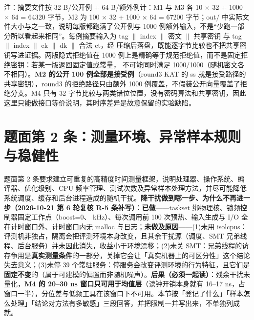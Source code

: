 \documentclass[UTF8,fontset=fandol,11pt,a4paper]{ctexart}
\begin{document}
\begin{landscape}
\begin{longtable}
\end{longtable}
\noindent 注：摘要文件按 32 B/公开例 + 64 B/额外例计：M1 与 M3 各 10 \texorpdfstring{$\times$}{x} 32 + 1000 \texorpdfstring{$\times$}{x} 64 = 64320 字节，M2 为 100 \texorpdfstring{$\times$}{x} 32 + 1000 \texorpdfstring{$\times$}{x} 64 = 67200 字节；out/ 中实际文件大小与之一致，说明每版都跑满了公开例与 1000 例额外输入，不是“少跑一部分所以看起来相同”。每例摘要输入为 tag \texorpdfstring{$\|$}{||} index \texorpdfstring{$\|$}{||} 密文 \texorpdfstring{$\|$}{||} 共享密钥 与 tag \texorpdfstring{$\|$}{||} index \texorpdfstring{$\|$}{||} ek \texorpdfstring{$\|$}{||} dk \texorpdfstring{$\|$}{||} 合法 ct，经 \texttt{} 压缩后落盘，既能逐字节比较也不把共享密钥写进证据。两版隐式拒绝值在 1000 例上是精确等于规范拒绝值，而不是固定拒绝密钥：若某一版返回固定值或常量，\texttt{} 不可能同时满足 1000/1000（随机密文各不相同）。\textbf{M2 的公开 100 例全部是接受例}（round3 KAT 的 ss 就是接受路径的共享密钥），round3 的拒绝路径只由额外 1000 例覆盖，不假装公开向量覆盖了拒绝分支。M4 只有 32 字节比较与两类错位位置，没有密码算法和共享密钥，因此这里只能做接口等价说明，其时序差异是故意保留的实验缺陷。\par\endgroup\vspace{3mm}\end{landscape}
\section{题面第 2 条：测量环境、异常样本规则与稳健性}
题面第 2 条要求建立可重复的高精度时间测量框架，说明处理器、操作系统、编译器、优化级别、CPU 频率管理、测试次数及异常样本处理方法，并尽可能降低系统调度、缓存和后台进程造成的随机干扰。\textbf{降干扰做到哪一步、为什么不再进一步（2026-10-21 第 6 轮复核 R-5 条补写）}：\textbf{已做}——taskset 绑物理核、锁频控制器固定工作点（boost=0、\texttt{} kHz）、每次调用前 100 次预热、输入生成与 I/O 全在计时窗口外、计时窗口内无 malloc 与日志；\textbf{未做及原因}——(1)未用 isolcpus：评测机非独占，隔离会把评测环境本身改变，且其余干扰源（调度、SMT 兄弟线程、后台服务）并未因此消失，收益小于环境漂移；(2)未关 SMT：兄弟线程的访存争用是\textbf{真实测量条件}的一部分，关掉它会让「真实机器上的可区分性」这个结论失去意义；(3)未停 39 个常驻服务：停服务会改变评测环境的行为特征，且它们是\textbf{固定不变}的（属于可建模的偏置而非随机噪声）。\textbf{后果（必须一起读）}：残余干扰未量化，\textbf{M4 的 20–30 ns 窗口只可用于均值层}（读钟开销本身就有 16–17 ns，占窗口一半），分位差与低频工具在该窗口下不可用。本节按「登记了什么」「样本怎么处理」「结论对方法有多敏感」三段回答，并把限制一并写出来，不单独列成就。
\end{document}
